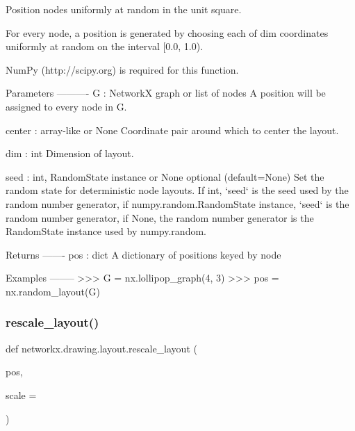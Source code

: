 \begin{DoxyVerb}Position nodes uniformly at random in the unit square.

For every node, a position is generated by choosing each of dim
coordinates uniformly at random on the interval [0.0, 1.0).

NumPy (http://scipy.org) is required for this function.

Parameters
----------
G : NetworkX graph or list of nodes
    A position will be assigned to every node in G.

center : array-like or None
    Coordinate pair around which to center the layout.

dim : int
    Dimension of layout.

seed : int, RandomState instance or None  optional (default=None)
    Set the random state for deterministic node layouts.
    If int, `seed` is the seed used by the random number generator,
    if numpy.random.RandomState instance, `seed` is the random
    number generator,
    if None, the random number generator is the RandomState instance used
    by numpy.random.

Returns
-------
pos : dict
    A dictionary of positions keyed by node

Examples
--------
>>> G = nx.lollipop_graph(4, 3)
>>> pos = nx.random_layout(G)\end{DoxyVerb}
 \mbox{\label{namespacenetworkx_1_1drawing_1_1layout_af6ddcb7319b47ee6b98301e3a15be250}} 
\subsubsection{\texorpdfstring{rescale\+\_\+layout()}{rescale\_layout()}}
{\footnotesize\ttfamily def networkx.\+drawing.\+layout.\+rescale\+\_\+layout (\begin{DoxyParamCaption}\item[{}]{pos,  }\item[{}]{scale = {} }\end{DoxyParamCaption})}


